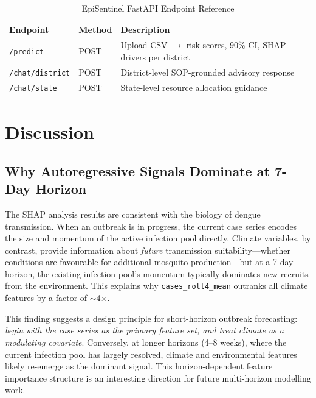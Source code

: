 \documentclass[conference]{IEEEtran}
\begin{document}
\begin{table}[htbp]
  \caption{EpiSentinel FastAPI Endpoint Reference}
  \label{tab:api}
  \centering
  \renewcommand{\arraystretch}{1.15}
  \setlength{\tabcolsep}{4pt}
  \begin{tabular}{llL{3.5cm}}
    \toprule
    \textbf{Endpoint} & \textbf{Method} & \textbf{Description} \\
    \midrule
    \texttt{/predict}       & POST &
      Upload CSV $\to$ risk scores, 90\% CI, SHAP drivers per district \\
    \texttt{/chat/district} & POST &
      District-level SOP-grounded advisory response \\
    \texttt{/chat/state}    & POST &
      State-level resource allocation guidance \\
    \bottomrule
  \end{tabular}
\end{table}

\section{Discussion}
\label{sec:discussion}

\subsection{Why Autoregressive Signals Dominate at 7-Day Horizon}

The SHAP analysis results are consistent with the biology of dengue
transmission. When an outbreak is in progress, the current case
series encodes the size and momentum of the active infection pool
directly. Climate variables, by contrast, provide information about
\emph{future} transmission suitability---whether conditions are
favourable for additional mosquito production---but at a 7-day
horizon, the existing infection pool's momentum typically dominates
new recruits from the environment. This explains why
\texttt{cases\_roll4\_mean} outranks all climate features by a
factor of $\sim$4$\times$.

This finding suggests a design principle for short-horizon outbreak
forecasting: \emph{begin with the case series as the primary feature
set, and treat climate as a modulating covariate}. Conversely, at
longer horizons (4--8 weeks), where the current infection pool has
largely resolved, climate and environmental features likely
re-emerge as the dominant signal. This horizon-dependent feature
importance structure is an interesting direction for future
multi-horizon modelling work.
\end{document}
